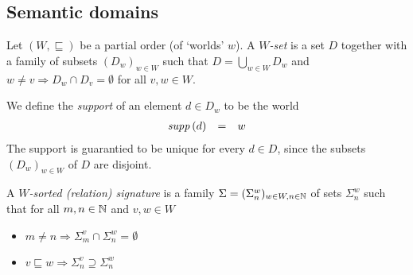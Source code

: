 \documentclass[12pt,a4paper]{report}
\begin{document}
%
%
%




\subsection{Semantic domains}

\begin{definition}
  Let $(W,\sqsubseteq)$ be a partial order (of `worlds' $w$).
  A {\em $W$-set} is a set $D$ together with a family of subsets $(D_w)_{w\in W}$ such that
  $D = \bigcup_{w\in W} D_w$ and $w \ne v \Rightarrow D_w \cap D_v = \emptyset$
  for all $v,w \in W$.
\end{definition}

We define the {\em support} of an element $d\in D_w$ to be the world
\[\begin{array}{rcl}
  \mathit{supp}\,(d) &=& w
\end{array}\]
The support is guarantied to be unique for every $d \in D$, since the subsets
$(D_w)_{w\in W}$ of $D$ are disjoint.

\begin{definition}
  A {\em $W$-sorted (relation) signature} is a family $\Sigma=(\Sigma^w_n)_{w\in W,n\in \mathbb N}$
  of sets $\Sigma^w_n$ such that for all $m,n\in \mathbb N$ and $v,w\in W$
  \begin{itemize}
    \item $m \ne n \Rightarrow \Sigma^v_m \cap \Sigma^w_n = \emptyset$
    \item $v \sqsubseteq w \Rightarrow \Sigma^v_n \supseteq \Sigma^w_n$
  \end{itemize}
\end{definition}
\end{document}
